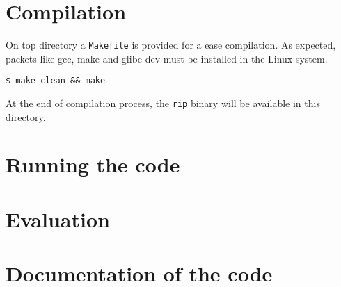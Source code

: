 \documentclass[10pt]{extarticle}
\begin{document}
\section{Compilation}

On top directory a \texttt{Makefile} is provided for a ease compilation. As
expected, packets like gcc, make and glibc-dev must be installed in the Linux
system.

\begin{Verbatim}
$ make clean && make
\end{Verbatim} %

At the end of compilation process, the \texttt{rip} binary will be available in
this directory.

\section{Running the code}




\section{Evaluation}


\section{Documentation of the code}
\end{document}
